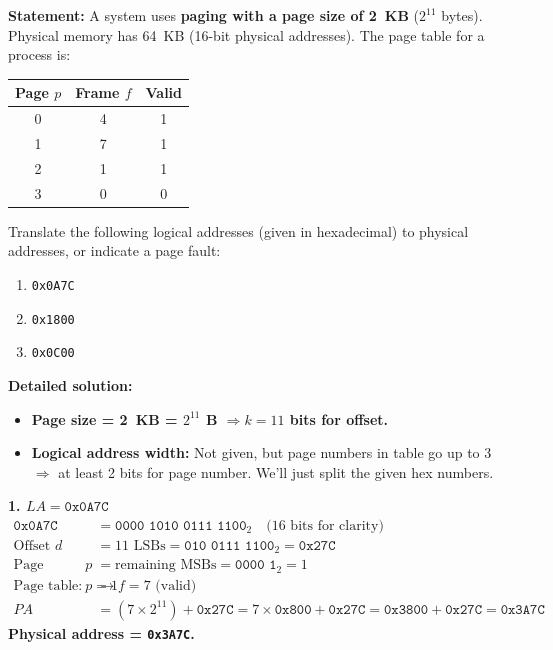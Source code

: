 \documentclass[11pt]{article}
\begin{document}
\begin{exoresolu}
\textbf{Statement:} A system uses \textbf{paging with a page size of \SI{2}{KB}} ($2^{11}$ bytes). Physical memory has \SI{64}{KB} (16-bit physical addresses). The page table for a process is:
\begin{center}
\begin{tabular}{|c|c|c|}\hline
Page $p$ & Frame $f$ & Valid \\ \hline
0 & 4 & 1 \\
1 & 7 & 1 \\
2 & 1 & 1 \\
3 & 0 & 0 \\ \hline
\end{tabular}
\end{center}
Translate the following logical addresses (given in hexadecimal) to physical addresses, or indicate a page fault:
\begin{enumerate}
    \item \texttt{0x0A7C}
    \item \texttt{0x1800}
    \item \texttt{0x0C00}
\end{enumerate}

\tcblower

\textbf{Detailed solution:}
\begin{itemize}
    \item \textbf{Page size = \SI{2}{KB} = $2^{11}$ B $\Rightarrow k=11$ bits for offset.}
    \item \textbf{Logical address width:} Not given, but page numbers in table go up to 3 $\Rightarrow$ at least 2 bits for page number. We'll just split the given hex numbers.
\end{itemize}

\textbf{1. $LA = \texttt{0x0A7C}$}
\begin{align*}
\texttt{0x0A7C} &= \texttt{0000 1010 0111 1100}_2 \quad\text{(16 bits for clarity)}\\
\text{Offset } d &= \text{11 LSBs} = \texttt{010 0111 1100}_2 = \texttt{0x27C}\\
\text{Page number } p &= \text{remaining MSBs} = \texttt{0000 1}_2 = 1\\
\text{Page table: } p=1 &\to f=7 \text{ (valid)}\\
PA &= (7 \times 2^{11}) + \texttt{0x27C} = 7 \times \texttt{0x800} + \texttt{0x27C} = \texttt{0x3800} + \texttt{0x27C} = \texttt{0x3A7C}
\end{align*}
\textbf{Physical address = \texttt{0x3A7C}.}


\end{exoresolu}
\end{document}
